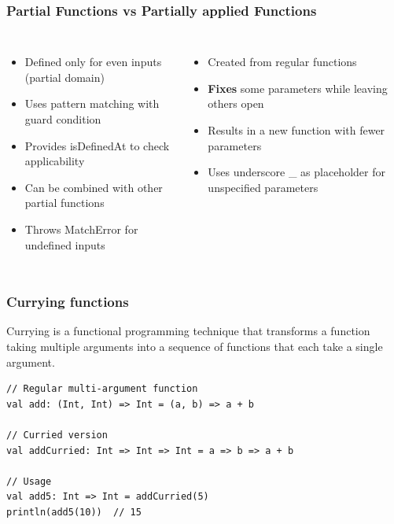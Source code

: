 \documentclass{beamer}
\begin{document}
\begin{frame}
\frametitle{Partial Functions vs Partially applied Functions}

\begin{columns}


\begin{itemize}
    \item Defined only for even inputs (partial domain)
    \item Uses pattern matching with guard condition
    \item Provides isDefinedAt to check applicability
    \item Can be combined with other partial functions
    \item Throws MatchError for undefined inputs
\end{itemize}
 

\begin{itemize}
    \item Created from regular functions
    \item \textbf{Fixes} some parameters while leaving others open
    \item Results in a new function with fewer parameters
    \item Uses underscore \_ as placeholder for unspecified parameters
\end{itemize}

\end{columns}
\end{frame}

\begin{frame}[fragile]
\frametitle{Currying functions}

Currying is a functional programming technique that transforms a function taking multiple arguments into a sequence of functions that each take a single argument. 

\begin{lstlisting}[style=scalaStyle]
// Regular multi-argument function
val add: (Int, Int) => Int = (a, b) => a + b

// Curried version
val addCurried: Int => Int => Int = a => b => a + b

// Usage
val add5: Int => Int = addCurried(5)
println(add5(10))  // 15

\end{lstlisting}
\end{frame}
\end{document}
